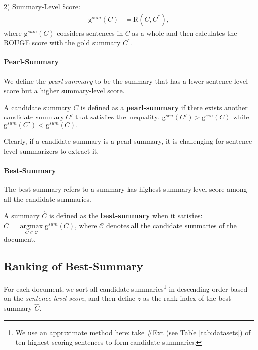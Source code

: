 2) Summary-Level Score:
\begin{align}
    \mathrm{g}^{sum}(C)  &=  \mathrm{R}(C, C^*) \label{eq:g_set},
\end{align}
where $\mathrm{g}^{sum}(C)$ considers sentences in $C$ as a whole and then calculates the ROUGE score with the gold summary $C^*$.

\paragraph{Pearl-Summary}
We define the \textit{pearl-summary} to be the summary that has a lower sentence-level score but a higher summary-level score.
\begin{Def}
A candidate summary $C$ is defined as a \textbf{pearl-summary} if there exists another candidate summary $C'$ that satisfies the inequality:
$
    \mathrm{g}^{sen}(C') > \mathrm{g}^{sen}(C)
$ while
$
    \mathrm{g}^{sum}(C') < \mathrm{g}^{sum}(C).
$
\end{Def}
Clearly, if a candidate summary is a pearl-summary, it is challenging for sentence-level summarizers to extract it.

\paragraph{Best-Summary}

The best-summary refers to a summary has highest summary-level score among all the candidate summaries.
\begin{Def}
A summary $\hat{C}$ is defined as the \textbf{best-summary} when it satisfies:
$\hat{C} = \mathop{\mathrm{argmax}}\limits_{C \in \mathcal{C}} \mathrm{g}^{sum} (C)$, where $\mathcal{C}$ denotes all the candidate summaries of the document.
\end{Def}

\subsection{Ranking of Best-Summary}
\label{sec:ranking}

For each document, we sort all candidate summaries\footnote{We use an approximate method here: take \#Ext (see Table \ref{tab:datasets}) of ten highest-scoring sentences to form candidate summaries.} in descending order based on the \textit{sentence-level score},
and then define $z$ as the rank index of the best-summary $\hat{C}$.

